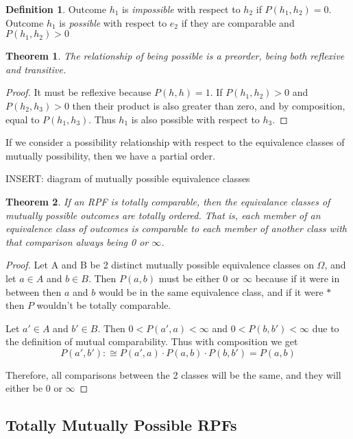 \documentclass[twoside]{article}
\theoremstyle{plain}%
\newtheorem{theorem}{Theorem}[section]
\theoremstyle{definition}
\newtheorem{definition}{Definition}[section]
\theoremstyle{remark}
\begin{document}
\begin{definition}
Outcome \(h_1\) is \textit{impossible} with respect to \(h_2\) if \(P(h_1, h_2) = 0\). Outcome \(h_1\) is \textit{possible} with respect to \(e_2\) if they are comparable and \(P(h_1, h_2) > 0\)
\end{definition}

\begin{theorem}
The relationship of being possible is a \textit{preorder}, being both reflexive and transitive.
\end{theorem}

\begin{proof}
It must be reflexive because \(P(h, h) = 1\). If \(P(h_1, h_2) > 0\) and \(P(h_2, h_3) > 0\) then their product is also greater than zero, and by composition, equal to \(P(h_1, h_3)\). Thus \(h_1\) is also possible with respect to \(h_3\).
\end{proof}

If we consider a possibility relationship with respect to the equivalence classes of mutually possibility, then we have a partial order.

INSERT: diagram of mutually possible equivalence classes

\begin{theorem}
If an RPF is totally comparable, then the equivalance classes of mutually possible outcomes are \textit{totally ordered}. That is, each member of an equivalence class of outcomes is comparable to each member of another class with that comparison always being 0 or \(\infty\).
\end{theorem}

\begin{proof}
Let A and B be 2 distinct mutually possible equivalence classes on \(\Omega\), and let \(a \in A\) and \(b \in B\). Then \(P(a, b)\) must be either 0 or \(\infty\) because if it were in between then \(a\) and \(b\) would be in the same equivalence class, and if it were \(\ast\) then \(P\) wouldn't be totally comparable.

Let \(a' \in A\) and \(b' \in B\). Then \(0 < P(a', a) < \infty\) and \(0 < P(b, b') < \infty\) due to the definition of mutual comparability. Thus with composition we get
\[P(a', b') :\cong P(a', a) \cdot P(a, b) \cdot P(b, b') = P(a, b)\]

Therefore, all comparisons between the 2 classes will be the same, and they will either be 0 or \(\infty\)
\end{proof}

\subsection{Totally Mutually Possible RPFs}
\end{document}
